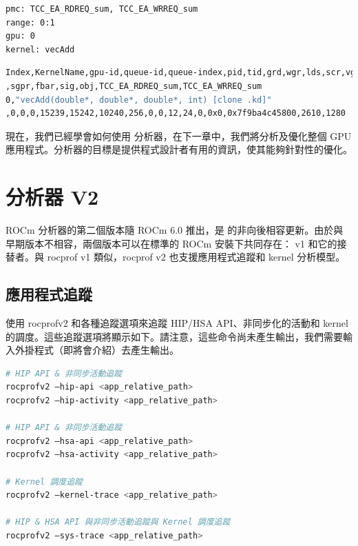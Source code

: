 \begin{lstlisting}[language=bash, caption={用於 vectorAddkernel 的\term{rocProf} 輸入檔}, label={lst:rocProf input file}]
pmc: TCC_EA_RDREQ_sum, TCC_EA_WRREQ_sum
range: 0:1
gpu: 0
kernel: vecAdd
\end{lstlisting}

\begin{lstlisting}[language=bash, caption={用於 vectorAddkernel的\term{rocProf}輸出檔}, label={lst:rocProf output file for the vectorAdd kernel}]
Index,KernelName,gpu-id,queue-id,queue-index,pid,tid,grd,wgr,lds,scr,vgpr
,sgpr,fbar,sig,obj,TCC_EA_RDREQ_sum,TCC_EA_WRREQ_sum
0,"vecAdd(double*, double*, double*, int) [clone .kd]"
,0,0,0,15239,15242,10240,256,0,0,12,24,0,0x0,0x7f9ba4c45800,2610,1280
\end{lstlisting}

現在，我們已經學會如何使用  分析器，在下一章中，我們將分析及優化整個 GPU 應用程式。分析器的目標是提供程式設計者有用的資訊，使其能夠針對性的優化。

\section{ 分析器 V2}

ROCm 分析器的第二個版本隨 ROCm 6.0 推出，是  的非向後相容更新。由於與早期版本不相容，兩個版本可以在標準的 ROCm 安裝下共同存在： v1 和它的接替者。與 rocprof v1 類似，rocprof v2 也支援應用程式追蹤和 kernel 分析模型。

\subsection{應用程式追蹤}

使用 rocprofv2 和各種追蹤選項來追蹤 HIP/HSA API、非同步化的活動和 kernel 的調度。這些追蹤選項將顯示如下。請注意，這些命令尚未產生輸出，我們需要輸入外掛程式（即將會介紹）去產生輸出。

\begin{lstlisting}[language=bash, caption={使用rocprofv2應用程式追蹤功能的命令}, label={lst:trace feature of rocprofv2}]
# HIP API & 非同步活動追蹤
rocprofv2 –hip-api <app_relative_path>
rocprofv2 –hip-activity <app_relative_path>

# HIP API & 非同步活動追蹤
rocprofv2 –hsa-api <app_relative_path>
rocprofv2 –hsa-activity <app_relative_path>

# Kernel 調度追蹤
rocprofv2 –kernel-trace <app_relative_path>

# HIP & HSA API 與非同步活動追蹤與 Kernel 調度追蹤
rocprofv2 –sys-trace <app_relative_path>
\end{lstlisting}

